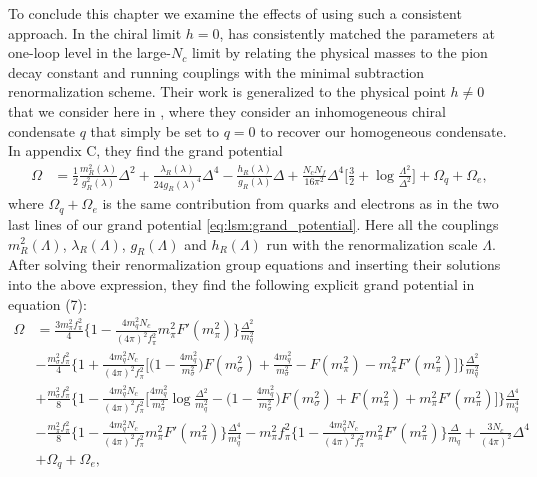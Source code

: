 To conclude this chapter we examine the effects of using such a consistent approach.
In the chiral limit $h=0$,
\cite{ref:jo_lsm_consistent_chiral} has consistently matched the parameters at one-loop level in the large-$N_c$ limit
by relating the physical masses to the pion decay constant and running couplings with the minimal subtraction renormalization scheme.
Their work is generalized to the physical point $h \neq 0$ that we consider here in \cite{ref:jo_lsm_consistent_physical},
where they consider an inhomogeneous chiral condensate $q$ that simply be set to $q=0$ to recover our homogeneous condensate.
In appendix C, they find the grand potential
\begin{equation}
\begin{split}
	\Omega &= \frac12 \frac{m_R^2(\lambda)}{g_R^2(\lambda)} \Delta^2 + \frac{\lambda_R(\lambda)}{24 g_R(\lambda)^4} \Delta^4 - \frac{h_R(\lambda)}{g_R(\lambda)} \Delta + \frac{N_c N_f}{16 \pi^2} \Delta^4 \bigg[ \frac32 + \log \frac{\Lambda^2}{\Delta^2} \bigg] + \Omega_q + \Omega_e,
\end{split}
\label{eq:lsm2f:grand_potential_consistent_before}
\end{equation}
where $\Omega_q+\Omega_e$ is the same contribution from quarks and electrons as in the two last lines of our grand potential \eqref{eq:lsm:grand_potential}.
Here all the couplings $m_R^2(\Lambda)$, $\lambda_R(\Lambda)$, $g_R(\Lambda)$ and $h_R(\Lambda)$ run with the renormalization scale $\Lambda$.
After solving their renormalization group equations and inserting their solutions into the above expression, they find the following explicit grand potential in equation (7):
\begin{equation}
\begin{split}
	\Omega &= \frac{3 m_\pi^2 f_\pi^2}{4} \Bigg\{ 1 - \frac{4 m_q^2 N_c}{(4\pi)^2 f_\pi^2} m_\pi^2 F'(m_\pi^2) \Bigg\} \frac{\Delta^2}{m_q^2} \\
	       &- \frac{m_\sigma^2 f_\pi^2}{4} \Bigg\{ 1 + \frac{4 m_q^2 N_c}{(4\pi)^2 f_\pi^2} \Bigg[ \bigg(1 - \frac{4 m_q^2}{m_\sigma^2}\bigg) F(m_\sigma^2) + \frac{4 m_q^2}{m_\sigma^2} - F(m_\pi^2) - m_\pi^2 F'(m_\pi^2) \Bigg] \Bigg\} \frac{\Delta^2}{m_q^2} \\
	       &+ \frac{m_\sigma^2 f_\pi^2}{8} \Bigg\{ 1 - \frac{4 m_q^2 N_c}{(4 \pi)^2 f_\pi^2} \Bigg[ \frac{4 m_q^2}{m_\sigma^2} \log \frac{\Delta^2}{m_q^2} - \bigg(1 - \frac{4 m_q^2}{m_\sigma^2}\bigg) F(m_\sigma^2) + F(m_\pi^2) + m_\pi^2 F'(m_\pi^2) \Bigg] \Bigg\} \frac{\Delta^4}{m_q^4} \\
	       &- \frac{m_\pi^2 f_\pi^2}{8} \Bigg\{ 1 - \frac{4 m_q^2 N_c}{(4\pi)^2 f_\pi^2} m_\pi^2 F'(m_\pi^2) \Bigg\} \frac{\Delta^4}{m_q^4} - m_\pi^2 f_\pi^2 \Bigg\{ 1 - \frac{4 m_q^2 N_c}{(4\pi)^2 f_\pi^2} m_\pi^2 F'(m_\pi^2) \Bigg\} \frac{\Delta}{m_q} + \frac{3 N_c}{(4 \pi)^2} \Delta^4 \\
	       &+ \Omega_q + \Omega_e ,
\end{split}
\label{eq:lsm2f:grand_potential_consistent}
\end{equation}
